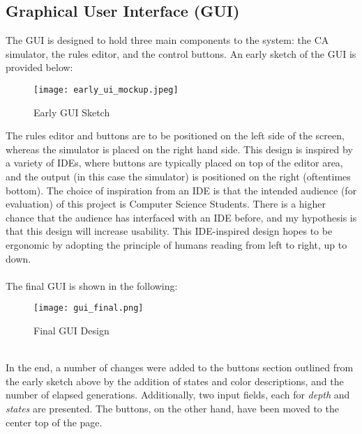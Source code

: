\subsection{Graphical User Interface (GUI)} \label{gui_component}
The GUI is designed to hold three main components to the system: the CA simulator, the rules editor, and the control buttons. An early sketch of the GUI is provided below: 
\\
\begin{figure}[H]
    \caption{Early GUI Sketch}
    \centering
    \texttt{[image: early\_ui\_mockup.jpeg]}
\end{figure}

\noindent The rules editor and buttons are to be positioned on the left side of the screen, whereas the simulator is placed on the right hand side. This design is inspired by a variety of IDEs, where buttons are typically placed on top of the editor area, and the output (in this case the simulator) is positioned on the right (oftentimes bottom). The choice of inspiration from an IDE is that the intended audience (for evaluation) of this project is Computer Science Students. There is a higher chance that the audience has interfaced with an IDE before, and my hypothesis is that this design will increase usability. This IDE-inspired design hopes to be ergonomic by adopting the principle of humans reading from left to right, up to down.
\\ \\
The final GUI is shown in the following:
\\
\begin{figure}[h]
    \caption{Final GUI Design}
    \label{fig:final_gui}
    \centering
    \texttt{[image: gui\_final.png]}
\end{figure}
\\
In the end, a number of changes were added to the buttons section outlined from the early sketch above by the addition of states and color descriptions, and the number of elapsed generations. Additionally, two input fields, each for \textit{depth} and \textit{states} are presented. The buttons, on the other hand, have been moved to the center top of the page. 

